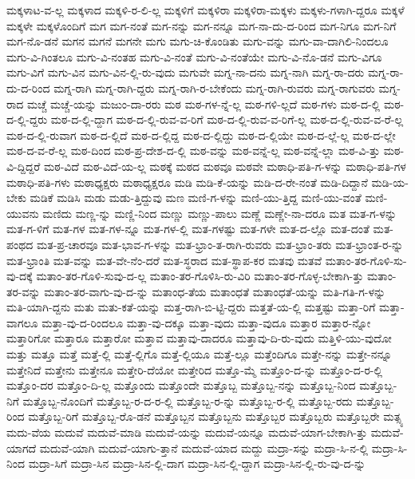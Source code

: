 {ಮಕ್ಕಳಾಟ-ವ-ಲ್ಲ
ಮಕ್ಕಳಾದ
ಮಕ್ಕಳಿ-ರ-ಲಿ-ಲ್ಲ
ಮಕ್ಕಳಿಗೆ
ಮಕ್ಕಳಿರಾ
ಮಕ್ಕಳಿರಾ-ಮಕ್ಕಳು
ಮಕ್ಕಳು-ಗಳಾಗಿ-ದ್ದರೂ
ಮಕ್ಕಳೆ
ಮಕ್ಕಳೇ
ಮಕ್ಕಳೊಂದಿಗೆ
ಮಗ
ಮಗ-ನಂತೆ
ಮಗ-ನನ್ನು
ಮಗ-ನನ್ನೂ
ಮಗ-ನಾ-ದು-ದ-ರಿಂದ
ಮಗ-ನಿಗೂ
ಮಗ-ನಿಗೆ
ಮಗ-ನೊ-ಡನೆ
ಮಗನ
ಮಗನೆ
ಮಗನೇ
ಮಗು
ಮಗು-ಚಿ-ಕೊಂಡಿತು
ಮಗು-ವನ್ನು
ಮಗು-ವಾ-ದಾಗಿಲಿ-ನಿಂದಲೂ
ಮಗು-ವಿ-ಗಿಂತಲೂ
ಮಗು-ವಿ-ನಂತಹ
ಮಗು-ವಿ-ನಂತೆ
ಮಗು-ವಿ-ನಂತೆಯೇ
ಮಗು-ವಿ-ನೊ-ಡನೆ
ಮಗು-ವಿಗೂ
ಮಗು-ವಿಗೆ
ಮಗು-ವಿನ
ಮಗು-ವಿನ-ಲ್ಲಿ-ರು-ವುದು
ಮಗುವೇ
ಮಗ್ನ-ನಾ-ದನು
ಮಗ್ನ-ನಾಗಿ
ಮಗ್ನ-ರಾ-ದರು
ಮಗ್ನ-ರಾ-ದು-ದ-ರಿಂದ
ಮಗ್ನ-ರಾಗಿ
ಮಗ್ನ-ರಾಗಿ-ದ್ದರು
ಮಗ್ನ-ರಾಗಿ-ರ-ಬೇಕೆಂದು
ಮಗ್ನ-ರಾಗಿ-ರುವರು
ಮಗ್ನ-ರಾಗುವರು
ಮಗ್ನ-ರಾದ
ಮಚ್ಚೆ
ಮಚ್ಚೆ-ಯನ್ನು
ಮಜುಂ-ದಾ-ರರು
ಮಠ
ಮಠ-ಗಳ-ನ್ನೆ-ಲ್ಲ
ಮಠ-ಗಳಿ-ಲ್ಲದೆ
ಮಠ-ಗಳು
ಮಠ-ದ-ಲ್ಲಿ
ಮಠ-ದ-ಲ್ಲಿ-ದ್ದರು
ಮಠ-ದ-ಲ್ಲಿ-ದ್ದಾಗ
ಮಠ-ದ-ಲ್ಲಿ-ರುವ-ವ-ರಿಗೆ
ಮಠ-ದ-ಲ್ಲಿ-ರುವ-ವ-ರಿಗೆ-ಲ್ಲ
ಮಠ-ದ-ಲ್ಲಿ-ರುವ-ವ-ರೆ-ಲ್ಲ
ಮಠ-ದ-ಲ್ಲಿ-ರುವಾಗ
ಮಠ-ದ-ಲ್ಲಿದೆ
ಮಠ-ದ-ಲ್ಲಿದ್ದ
ಮಠ-ದ-ಲ್ಲಿದ್ದು
ಮಠ-ದ-ಲ್ಲಿಯೇ
ಮಠ-ದ-ಲ್ಲೆ-ಲ್ಲ
ಮಠ-ದ-ಲ್ಲೇ
ಮಠ-ದ-ವ-ರೆ-ಲ್ಲ
ಮಠ-ದಿಂದ
ಮಠ-ಪ್ರ-ದೇಶ-ದ-ಲ್ಲಿ
ಮಠ-ವನ್ನು
ಮಠ-ವನ್ನೆ-ಲ್ಲ
ಮಠ-ವನ್ನೆ-ಲ್ಲಾ
ಮಠ-ವಿ-ತ್ತು
ಮಠ-ವಿ-ದ್ದಿದ್ದರೆ
ಮಠ-ವಿದೆ
ಮಠ-ವಿದೆ-ಯ-ಲ್ಲ
ಮಠಕ್ಕೆ
ಮಠದ
ಮಠವೂ
ಮಠವೇ
ಮಠಾಧಿ-ಪತಿ-ಗ-ಳನ್ನು
ಮಠಾಧಿ-ಪತಿ-ಗಳ
ಮಠಾಧಿ-ಪತಿ-ಗಳು
ಮಠಾಧ್ಯಕ್ಷರು
ಮಠಾಧ್ಯಕ್ಷರೂ
ಮಡಿ
ಮಡಿ-ಕೆ-ಯನ್ನು
ಮಡಿ-ದ-ರೇ-ನಂತೆ
ಮಡಿ-ದಿದ್ದಾನೆ
ಮಡಿ-ಯ-ಬೇಕು
ಮಡಿಕೆ
ಮಡಿಸಿ
ಮಡು
ಮಡು-ತ್ತಿದ್ದುವು
ಮಣ
ಮಣಿ-ಗ-ಳನ್ನು
ಮಣಿ-ಯು-ತ್ತಿದ್ದ
ಮಣಿ-ಯು-ವಂತೆ
ಮಣಿ-ಯುವನು
ಮಣಿದು
ಮಣ್ಣ-ನ್ನು
ಮಣ್ಣಿ-ನಿಂದ
ಮಣ್ಣು
ಮಣ್ಣು-ಪಾಲು
ಮಣ್ಣೆ
ಮಣ್ಣೇ-ನಾ-ದರೂ
ಮತ
ಮತ-ಗ-ಳನ್ನು
ಮತ-ಗ-ಳಿಗೆ
ಮತ-ಗಳ
ಮತ-ಗಳ-ನ್ನೂ
ಮತ-ಗಳ-ಲ್ಲಿ
ಮತ-ಗಳಷ್ಟು
ಮತ-ಗಳೇ
ಮತ-ದ-ಲ್ಲೊ
ಮತ-ದಂತೆ
ಮತ-ಪಂಥದ
ಮತ-ಪ್ರ-ಚಾರವೂ
ಮತ-ಭಾವ-ಗ-ಳನ್ನು
ಮತ-ಭ್ರಾಂ-ತ-ರಾಗಿ-ರುವರು
ಮತ-ಭ್ರಾಂ-ತರು
ಮತ-ಭ್ರಾಂತ-ರ-ನ್ನು
ಮತ-ಭ್ರಾಂತಿ
ಮತ-ವನ್ನು
ಮತ-ವೇ-ನೆಂ-ದರೆ
ಮತ-ಸ್ಥರಾದ
ಮತ-ಸ್ಥಾಪ-ಕರ
ಮತವು
ಮತವೆ
ಮತಾಂ-ತರ-ಗೊಳಿ-ಸು-ವು-ದಕ್ಕೆ
ಮತಾಂ-ತರ-ಗೊಳಿ-ಸುವು-ದ-ಲ್ಲ
ಮತಾಂ-ತರ-ಗೊಳಿಸಿ-ರು-ವಿರಿ
ಮತಾಂ-ತರ-ಗೊಳ್ಳ-ಬೇಕಾಗಿ-ತ್ತು
ಮತಾಂ-ತರ-ವನ್ನು
ಮತಾಂ-ತರ-ವಾಗು-ವು-ದ-ನ್ನು
ಮತಾಂಧ-ತೆಯ
ಮತಾಂಧತೆ
ಮತಾಂಧತೆ-ಯನ್ನು
ಮತಿ-ಗತಿ-ಗ-ಳನ್ನು
ಮತಿ-ಯಾಗಿ-ದ್ದನು
ಮತು
ಮತು-ಕತೆ-ಯನ್ನು
ಮತ್ತ-ರಾಗಿ-ಬಿ-ಟ್ಟಿ-ದ್ದರು
ಮತ್ತತೆ-ಯ-ಲ್ಲಿ
ಮತ್ತಷ್ಟು
ಮತ್ತಾ-ರಿಗೆ
ಮತ್ತಾ-ವಾಗಲೂ
ಮತ್ತಾ-ವು-ದ-ರಿಂದಲೂ
ಮತ್ತಾ-ವು-ದಕ್ಕೂ
ಮತ್ತಾ-ವುದು
ಮತ್ತಾ-ವುದೂ
ಮತ್ತಾರ
ಮತ್ತಾರ-ನ್ನೋ
ಮತ್ತಾರಿಗೋ
ಮತ್ತಾರೂ
ಮತ್ತಾರೋ
ಮತ್ತಾವ
ಮತ್ತಾವು-ದಾದರೂ
ಮತ್ತಾವು-ದಿ-ರು-ವುದು
ಮತ್ತಿಳಿ-ಯು-ವುದೋ
ಮತ್ತು
ಮತ್ತೂ
ಮತ್ತೆ
ಮತ್ತೆ-ಲ್ಲಿ
ಮತ್ತೆ-ಲ್ಲಿಗೊ
ಮತ್ತೆ-ಲ್ಲಿಯೂ
ಮತ್ತೆ-ಲ್ಲೂ
ಮತ್ತೆಂದಿಗೂ
ಮತ್ತೇ-ನನ್ನು
ಮತ್ತೇ-ನನ್ನೂ
ಮತ್ತೇನಿದೆ
ಮತ್ತೇನು
ಮತ್ತೇನೂ
ಮತ್ತೇರಿ-ದೆಯೋ
ಮತ್ತೇರಿದ
ಮತ್ತೊ-ಮ್ಮೆ
ಮತ್ತೊಂ-ದ-ನ್ನು
ಮತ್ತೊಂ-ದ-ರ-ಲ್ಲಿ
ಮತ್ತೊಂ-ದರ
ಮತ್ತೊಂ-ದಿ-ಲ್ಲ
ಮತ್ತೊಂದು
ಮತ್ತೊಂದೇ
ಮತ್ತೊಬ್ಬ
ಮತ್ತೊಬ್ಬ-ನನ್ನು
ಮತ್ತೊಬ್ಬ-ನಿಂದ
ಮತ್ತೊಬ್ಬ-ನಿಗೆ
ಮತ್ತೊಬ್ಬ-ನೊಂದಿಗೆ
ಮತ್ತೊಬ್ಬ-ರ-ದ-ರ-ಲ್ಲಿ
ಮತ್ತೊಬ್ಬ-ರ-ನ್ನು
ಮತ್ತೊಬ್ಬ-ರ-ಲ್ಲಿ
ಮತ್ತೊಬ್ಬ-ರದು
ಮತ್ತೊಬ್ಬ-ರಿಂದ
ಮತ್ತೊಬ್ಬ-ರಿಗೆ
ಮತ್ತೊಬ್ಬ-ರೊ-ಡನೆ
ಮತ್ತೊಬ್ಬನ
ಮತ್ತೊಬ್ಬನು
ಮತ್ತೊಬ್ಬರ
ಮತ್ತೊಬ್ಬರು
ಮತ್ತೊಬ್ಬರೇ
ಮತ್ಸ್ಯ
ಮದು-ವೆಯ
ಮದುವೆ
ಮದುವೆ-ಮಾಡಿ
ಮದುವೆ-ಯನ್ನು
ಮದುವೆ-ಯನ್ನೂ
ಮದುವೆ-ಯಾಗ-ಬೇಕಾಗಿ-ತ್ತು
ಮದುವೆ-ಯಾಗದೆ
ಮದುವೆ-ಯಾಗಿ
ಮದುವೆ-ಯಾಗು-ತ್ತಾನೆ
ಮದುವೆ-ಯಾದ
ಮದ್ದು
ಮದ್ರಾ-ಸನ್ನು
ಮದ್ರಾ-ಸಿ-ನ-ಲ್ಲಿ
ಮದ್ರಾ-ಸಿ-ನಿಂದ
ಮದ್ರಾ-ಸಿಗೆ
ಮದ್ರಾ-ಸಿನ
ಮದ್ರಾ-ಸಿನ-ಲ್ಲಿ-ದಾಗ
ಮದ್ರಾ-ಸಿನ-ಲ್ಲಿ-ದ್ದಾಗ
ಮದ್ರಾ-ಸಿನ-ಲ್ಲಿ-ರು-ವು-ದ-ನ್ನು
}

